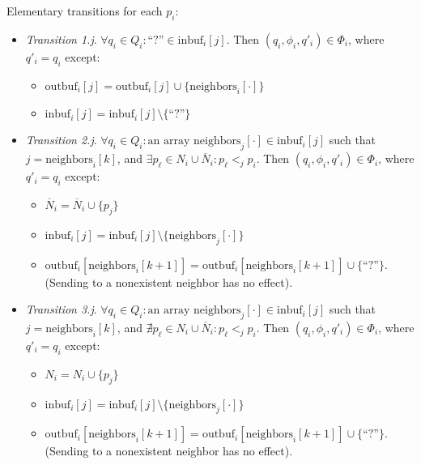 Elementary transitions for each $p_i$:
\begin{itemize}
\item \emph{Transition 1.j}. $\forall q_i \in Q_i: \text{``?''} \in \text{inbuf}_i[j]$.
      Then $(q_i, \phi_i, q'_i) \in \Phi_i$,
      where $q'_i = q_i$ except:
      \begin{itemize}
      \item $\text{outbuf}_i[j] = \text{outbuf}_i[j] \cup \{\text{neighbors}_i[\cdot]\}$
      \item $\text{inbuf}_i[j] = \text{inbuf}_i[j] \setminus \text{\{``?''\}}$
      \end{itemize}
\item \emph{Transition 2.j}. $\forall q_i \in Q_i: \text{an array neighbors}_j[\cdot] \in \text{inbuf}_i[j]$
      such that $j = \text{neighbors}_i[k]$,
      and $\exists p_{\ell} \in N_i \cup \overline{N}_i: p_{\ell} <_j p_i$.
      Then $(q_i, \phi_i, q'_i) \in \Phi_i$,
      where $q'_i = q_i$ except:
      \begin{itemize}
      \item $\overline{N}_i = \overline{N}_i \cup \{ p_j \}$
      \item $\text{inbuf}_i[j] = \text{inbuf}_i[j] \setminus \{\text{neighbors}_j[\cdot]\}$
      \item $\text{outbuf}_i[\text{neighbors}_i[k + 1]] = 
             \text{outbuf}_i[\text{neighbors}_i[k + 1]] \cup \text{\{``?''\}}$. (Sending
             to a nonexistent neighbor has no effect).
      \end{itemize}
\item \emph{Transition 3.j}. $\forall q_i \in Q_i: \text{an array neighbors}_j[\cdot] \in \text{inbuf}_i[j]$
      such that $j = \text{neighbors}_i[k]$,
      and $\nexists p_{\ell} \in N_i \cup \overline{N}_i: p_{\ell} <_j p_i$.
      Then $(q_i, \phi_i, q'_i) \in \Phi_i$,
      where $q'_i = q_i$ except:
      \begin{itemize}
      \item $N_i = N_i \cup \{ p_j \}$
      \item $\text{inbuf}_i[j] = \text{inbuf}_i[j] \setminus \{\text{neighbors}_j[\cdot]\}$
      \item $\text{outbuf}_i[\text{neighbors}_i[k + 1]] = 
             \text{outbuf}_i[\text{neighbors}_i[k + 1]] \cup \{\text{``?''}\}$. (Sending
             to a nonexistent neighbor has no effect).
      \end{itemize}
\end{itemize}

